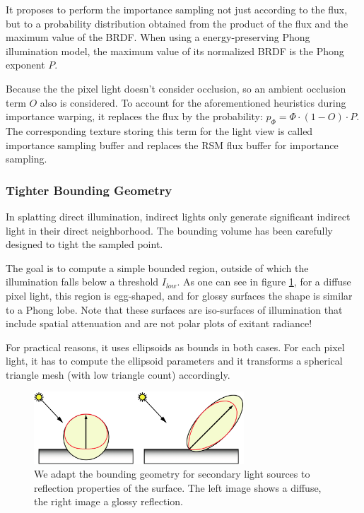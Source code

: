 It proposes to perform the importance sampling not just according to the flux, but to a probability distribution obtained from the product of the flux and the maximum value of the BRDF. When using a energy-preserving Phong illumination model, the maximum value of its normalized BRDF is the Phong exponent $P$.

Because the the pixel light doesn't consider occlusion, so an ambient occlusion term $O$ also is considered. To account for the aforementioned heuristics during importance warping, it replaces the flux by the probability: $p_{\Phi} = \Phi\cdot (1 - O) \cdot P$. The corresponding texture storing this term for the light view is called importance sampling buffer and replaces the RSM flux buffer for importance sampling.




\subsubsection{Tighter Bounding Geometry}
In splatting direct illumination, indirect lights only generate significant indirect light in their direct neighborhood. The bounding volume has been carefully designed to tight the sampled point.

The goal is to compute a simple bounded region, outside of which the illumination falls below a threshold $I_{low}$. As one can see in figure \ref{f:splatting-indirect-illumination-3}, for a diffuse pixel light, this region is egg-shaped, and for glossy surfaces the shape is similar to a Phong lobe. Note that these surfaces are iso-surfaces of illumination that include spatial attenuation and are not polar plots of exitant radiance!

For practical reasons, it uses ellipsoids as bounds in both cases. For each pixel light, it has to compute the ellipsoid parameters and it transforms a spherical triangle mesh (with low triangle count) accordingly. 

\begin{figure}\label{f:splatting-indirect-illumination-3}
	\begin{center}
		\includegraphics[width=0.7\textwidth]{graphics/ir/ir-3-3}
	\end{center}
	\caption{We adapt the bounding geometry for secondary light sources to reflection properties of the surface. The left image shows a diffuse, the right image a glossy reflection.}
\end{figure}

